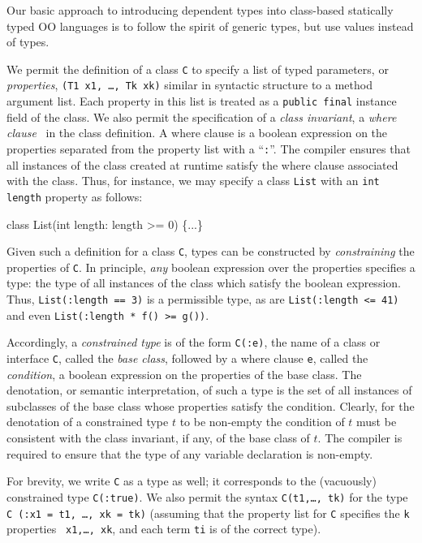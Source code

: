 Our basic approach to introducing dependent types into
class-based statically typed OO languages is to
follow the spirit of generic types, but use values instead of
types.

We permit the definition of a class {\tt C} to specify
a list of typed parameters, or {\em properties},
{\tt (T1 x1, \ldots, Tk xk)} similar in syntactic structure to
a method argument list. Each
property in this list is treated as a {\tt public final} instance
field of the class.
We also permit the
specification of a {\em class invariant}, a
{\em where clause}~\cite{where-clauses}
in the class definition. A where
clause is a boolean expression on the properties separated from the
property list with a ``{\tt :}''.  The compiler ensures that all
instances of the class created at runtime satisfy the where clause
associated with the class.
Thus, for instance, we may specify a class {\tt List} with an
{\tt int length} property as follows:
\begin{code}
  class List(int length: length >= 0) \{...\}
\end{code}

Given such a definition for a class {\tt C},
types can be constructed by {\em constraining} the properties of
{\tt C}.
In principle, {\em any} boolean expression over the
properties specifies a type: the type of all instances of the
class which satisfy the boolean expression. Thus,
{\tt List(:length == 3)} is a permissible type, as are
{\tt List(:length <= 41)} and even
{\tt List(:length * f() >= g())}.


Accordingly, a {\em constrained type} is of the form {\tt C(:e)}, the name of
a class or interface {\tt C}, called the {\em base class}, followed by a
where clause {\tt e}, called the {\em condition}, a boolean expression
on the properties of the base class. 
The denotation, or
semantic interpretation, of such a type is the set of all instances
of subclasses of the base class whose properties satisfy the
condition.
Clearly, for the denotation of a constrained type $t$ to be
non-empty the condition of $t$ must be consistent with the class
invariant, if any, of the base class of $t$.  The compiler is required to
ensure that the type of any variable declaration is non-empty.

For brevity, we write {\tt C} as a type as well; it
corresponds to the (vacuously) constrained type {\tt C(:true)}.
We also permit the syntax {\tt C(t1,\ldots, tk)} for
the type {\tt C (:x1 = t1, \ldots, xk = tk)} (assuming that
the property list for {\tt C} specifies the {\tt k} properties {\tt
x1,\ldots, xk}, and each term {\tt ti} is of the correct
type). 

